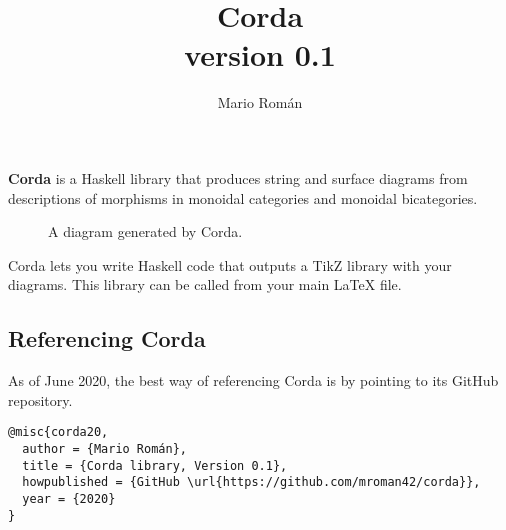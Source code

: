 \documentclass{article}
\title{Corda \\ \normalsize{\textsf{version 0.1}}}
\author{Mario Román}
\begin{document}
\maketitle

\textbf{Corda} is a Haskell library that produces string and surface diagrams from descriptions of morphisms in monoidal categories and monoidal bicategories.
\begin{figure}[h]
  \centering
  \assocDiagram
  \caption{A diagram generated by Corda.}
\end{figure}

Corda lets you write Haskell code that outputs a TikZ library with your diagrams. This library can be called from your main LaTeX file.

\subsection*{Referencing Corda}

As of June 2020, the best way of referencing \textsf{Corda} is by pointing to its GitHub repository.

\begin{verbatim}
@misc{corda20,
  author = {Mario Román},
  title = {Corda library, Version 0.1},
  howpublished = {GitHub \url{https://github.com/mroman42/corda}},
  year = {2020}
}

\end{verbatim}
\end{document}
